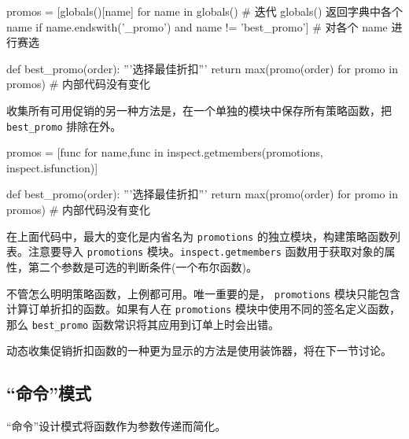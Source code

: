 \begin{python}
promos = [globals()[name] for name in globals() # 迭代 globals() 返回字典中各个 name
          if name.endswith('_promo')
          and name != 'best_promo']             # 对各个 name 进行赛选

def best_promo(order):
    '''选择最佳折扣'''
    return max(promo(order) for promo in promos)    # 内部代码没有变化
\end{python}

收集所有可用促销的另一种方法是，在一个单独的模块中保存所有策略函数，把 \texttt{best\_promo} 排除在外。

\begin{python}
promos = [func for name,func in inspect.getmembers(promotions, inspect.isfunction)]

def best_promo(order):
    '''选择最佳折扣'''
    return max(promo(order) for promo in promos)    # 内部代码没有变化
\end{python}

在上面代码中，最大的变化是内省名为 \texttt{promotions} 的独立模块，构建策略函数列表。注意要导入 \texttt{promotions} 模块。\texttt{inspect.getmembers} 函数用于获取对象的属性，第二个参数是可选的判断条件(一个布尔函数)。

不管怎么明明策略函数，上例都可用。唯一重要的是， \texttt{promotions} 模块只能包含计算订单折扣的函数。如果有人在 \texttt{promotions} 模块中使用不同的签名定义函数，那么 \texttt{best\_promo} 函数常识将其应用到订单上时会出错。

动态收集促销折扣函数的一种更为显示的方法是使用装饰器，将在下一节讨论。

\subsection{``命令''模式}

``命令''设计模式将函数作为参数传递而简化。

